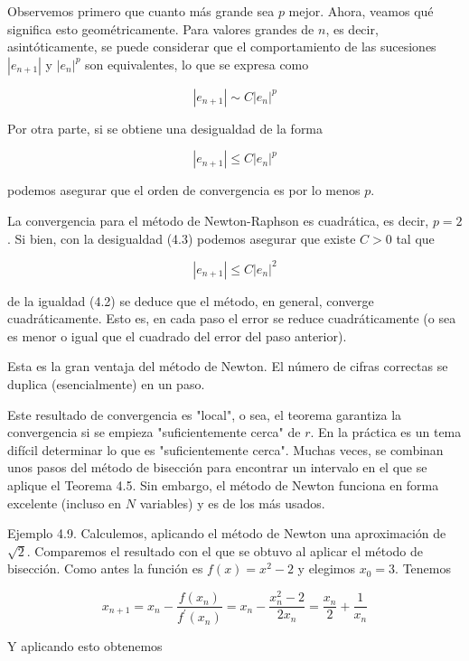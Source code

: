 \documentclass[10pt]{book}
\begin{document}
Observemos primero que cuanto más grande sea $p$ mejor. Ahora, veamos qué significa esto geométricamente. Para valores grandes de $n$, es decir, asintóticamente, se puede considerar que el comportamiento de las sucesiones $\left|e_{n+1}\right|$ y $\left|e_{n}\right|^{p}$ son equivalentes, lo que se expresa como

$$
\left|e_{n+1}\right| \sim C\left|e_{n}\right|^{p}
$$

Por otra parte, si se obtiene una desigualdad de la forma

$$
\left|e_{n+1}\right| \leq C\left|e_{n}\right|^{p}
$$

podemos asegurar que el orden de convergencia es por lo menos $p$.

La convergencia para el método de Newton-Raphson es cuadrática, es decir, $p=2$. Si bien, con la desigualdad (4.3) podemos asegurar que existe $C>0$ tal que

$$
\left|e_{n+1}\right| \leq C\left|e_{n}\right|^{2}
$$

de la igualdad (4.2) se deduce que el método, en general, converge cuadráticamente. Esto es, en cada paso el error se reduce cuadráticamente (o sea es menor o igual que el cuadrado del error del paso anterior).

Esta es la gran ventaja del método de Newton. El número de cifras correctas se duplica (esencialmente) en un paso.

Este resultado de convergencia es "local", o sea, el teorema garantiza la convergencia si se empieza "suficientemente cerca" de $r$. En la práctica es un tema difícil determinar lo que es "suficientemente cerca". Muchas veces, se combinan unos pasos del método de bisección para encontrar un intervalo en el que se aplique el Teorema 4.5. Sin embargo, el método de Newton funciona en forma excelente (incluso en $N$ variables) y es de los más usados.

Ejemplo 4.9. Calculemos, aplicando el método de Newton una aproximación de $\sqrt{2}$. Comparemos el resultado con el que se obtuvo al aplicar el método de bisección. Como antes la función es $f(x)=x^{2}-2$ y elegimos $x_{0}=3$. Tenemos


\begin{equation*}
x_{n+1}=x_{n}-\frac{f\left(x_{n}\right)}{f^{\prime}\left(x_{n}\right)}=x_{n}-\frac{x_{n}^{2}-2}{2 x_{n}}=\frac{x_{n}}{2}+\frac{1}{x_{n}} \tag{4.4}
\end{equation*}


Y aplicando esto obtenemos
\end{document}

